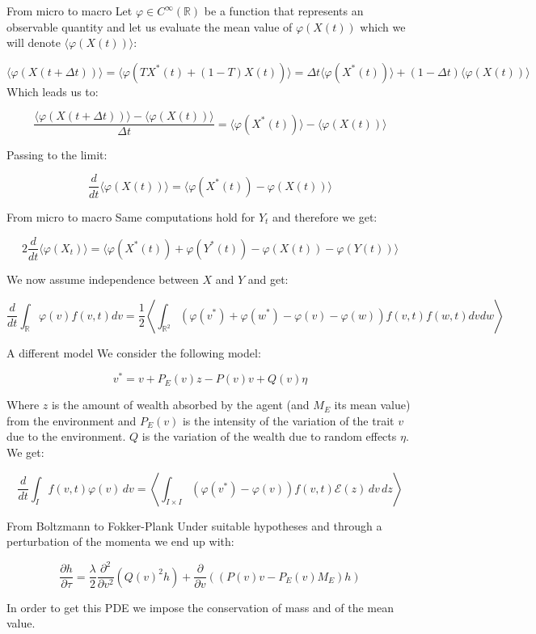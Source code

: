 \documentclass[10pt, compress]{beamer}
\begin{document}
\begin{frame}{From micro to macro}
    Let $\varphi\in C^{\infty}(\mathbb{R})$ be a function that represents an observable quantity and let us evaluate the mean value of $\varphi(X(t))$ which we will denote $\langle\varphi(X(t))\rangle$:

\[\langle\varphi(X(t+\Delta t))\rangle=\langle\varphi(TX^{*}(t)+(1-T)X(t))\rangle=\Delta t\langle\varphi(X^{*}(t))\rangle+(1-\Delta t)\langle\varphi(X(t))\rangle\]
Which leads us to:

\[\frac{\langle\varphi(X(t+\Delta t))\rangle-\langle\varphi(X(t))\rangle}{\Delta t}=\langle\varphi(X^{*}(t))\rangle-\langle\varphi(X(t))\rangle\]

Passing to the limit:

    \[\frac{d}{dt}\langle\varphi(X(t))\rangle=\langle\varphi(X^{*}(t))-\varphi(X(t))\rangle\]
\end{frame}

\begin{frame}{From micro to macro}
    Same computations hold for $Y_t$ and therefore we get:

    \[2\frac{d}{dt}\langle\varphi(X_t)\rangle=\langle\varphi(X^{*}(t))+\varphi(Y^{*}(t))-\varphi(X(t))-\varphi(Y(t))\rangle\]

    We now assume independence between $X$ and $Y$ and get:

    \[ \frac{d}{dt}\int_{\mathbb{R}}\varphi(v)f(v,t)dv=\frac{1}{2}\left\langle\int_{\mathbb{R}^2}(\varphi(v^{*})+\varphi(w^{*})-\varphi(v)-\varphi(w))f(v,t)f(w,t)dvdw\right\rangle \]
\end{frame}

\begin{frame}{A different model}
    We consider the following model:

    \[v^{*} = v + P_E(v)z - P(v)v + Q(v)\eta\]

    Where $z$ is the amount of wealth absorbed by the agent (and $M_E$ its mean value) from the environment and $P_E(v)$ is the intensity of the variation of the trait $v$ due to the environment. $Q$ is the variation of the wealth due to random effects $\eta$. We get:

    \[\frac{d}{dt}\int_{I}f(v,t)\varphi(v) \,dv = \left\langle\int_{I\times I}(\varphi(v^{*})-\varphi(v))f(v,t)\mathcal{E}(z) \,dv\,dz\right\rangle\]
\end{frame}

\begin{frame}{From Boltzmann to Fokker-Plank}
    Under suitable hypotheses and through a perturbation of the momenta we end up with:

\hspace{5mm}

    \[\frac{\partial h}{\partial\tau}=\frac{\lambda}{2}\frac{\partial^2}{\partial v^2}(Q(v)^2h)+\frac{\partial}{\partial v}((P(v)v-P_E(v)M_E)h)\]

\hspace{5mm}

    In order to get this PDE we impose the conservation of mass and of the mean value.
\end{frame}
\end{document}
